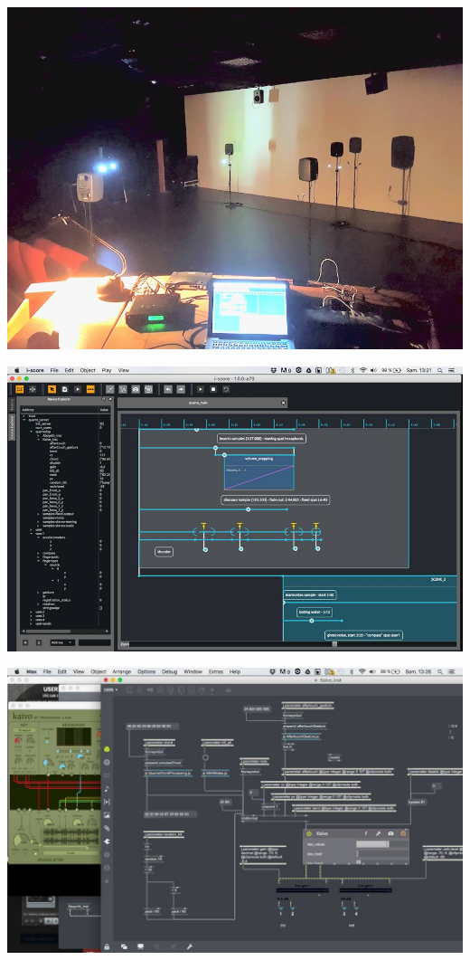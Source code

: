 \documentclass[handout]{beamer}
\begin{document}
\begin{frame}
\centering
\includegraphics[width=\textwidth]{images/quarre.jpg}
\end{frame}

\begin{frame}
\centering
\includegraphics[width=\textwidth]{images/quarre-2.jpg}
\end{frame}

\begin{frame}
\centering
\includegraphics[width=\textwidth]{images/quarre-3.jpg}
\end{frame}
\end{document}
